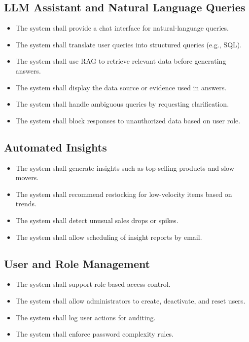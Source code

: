 \subsection{LLM Assistant and Natural Language Queries}
\begin{itemize}
    \item The system shall provide a chat interface for natural-language queries.
    \item The system shall translate user queries into structured queries (e.g., SQL).
    \item The system shall use RAG to retrieve relevant data before generating answers.
    \item The system shall display the data source or evidence used in answers.
    \item The system shall handle ambiguous queries by requesting clarification.
    \item The system shall block responses to unauthorized data based on user role.
\end{itemize}

\subsection{Automated Insights}
\begin{itemize}
    \item The system shall generate insights such as top-selling products and slow movers.
    \item The system shall recommend restocking for low-velocity items based on trends.
    \item The system shall detect unusual sales drops or spikes.
    \item The system shall allow scheduling of insight reports by email.
\end{itemize}

\subsection{User and Role Management}
\begin{itemize}
    \item The system shall support role-based access control.
    \item The system shall allow administrators to create, deactivate, and reset users.
    \item The system shall log user actions for auditing.
    \item The system shall enforce password complexity rules.
\end{itemize}

